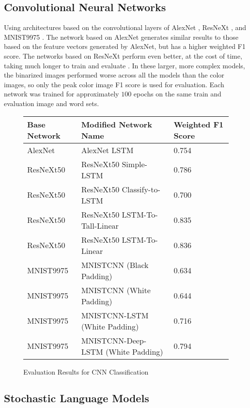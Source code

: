 \subsection{Convolutional Neural Networks}

Using architectures based on the convolutional layers of AlexNet \cite{Krizhevsky}, ResNeXt \cite{Xie}, and MNIST9975 \cite{Deotte}. The network based on AlexNet generates similar results to those based on the feature vectors generated by AlexNet, but has a higher weighted F1 score. The networks based on ResNeXt perform even better, at the cost of time, taking much longer to train and evaluate . In these larger, more complex models, the binarized images performed worse across all the models than the color images, so only the peak color image F1 score is used for evaluation. Each network was trained for approximately $100$ epochs on the same train and evaluation image and word sets.

\begin{figure}[H]
    \caption{Evaluation Results for CNN Classification}
    \label{fig:classificationCNN}
    \centering
    \begin{tabular}{ | l | l | l | }
        \hline
        Base Network & Modified Network Name & Weighted F1 Score \\
        \hline
        AlexNet & AlexNet LSTM & 0.754 \\
        ResNeXt50 & ResNeXt50 Simple-LSTM & 0.786 \\
        ResNeXt50 & ResNeXt50 Classify-to-LSTM & 0.700 \\
        ResNeXt50 & ResNeXt50 LSTM-To-Tall-Linear & 0.835 \\
        ResNeXt50 & ResNeXt50 LSTM-To-Linear & 0.836 \\
        MNIST9975 & MNISTCNN (Black Padding) & 0.634 \\
        MNIST9975 & MNISTCNN (White Padding) & 0.644 \\
        MNIST9975 & MNISTCNN-LSTM (White Padding) & 0.716 \\
        MNIST9975 & MNISTCNN-Deep-LSTM (White Padding) & 0.794 \\
        \hline
    \end{tabular}
\end{figure}

\subsection{Stochastic Language Models}

